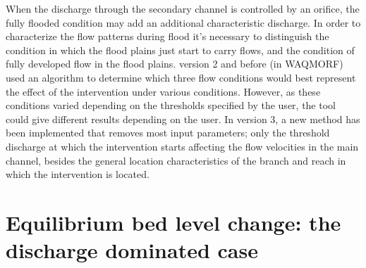 When the discharge through the secondary channel is controlled by an orifice, the fully flooded condition may add an additional characteristic discharge.
In order to characterize the flow patterns during flood it's necessary to distinguish the condition in which the flood plains just start to carry flows, and the condition of fully developed flow in the flood plains.
\dfastmi version 2 and before (in WAQMORF) used an algorithm to determine which three flow conditions would best represent the effect of the intervention under various conditions.
However, as these conditions varied depending on the thresholds specified by the user, the tool could give different results depending on the user.
In \dfastmi version 3, a new method has been implemented that removes most input parameters; only the threshold discharge at which the intervention starts affecting the flow velocities in the main channel, besides the general location characteristics of the branch and reach in which the intervention is located.


\section{Equilibrium bed level change: the discharge dominated case}

